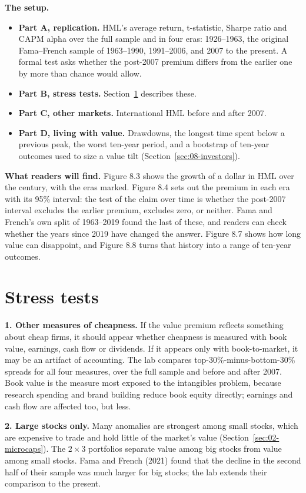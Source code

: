 \textbf{The setup.}

\begin{itemize}
  \item \textbf{Part A, replication.} HML's average return, t-statistic, Sharpe ratio and CAPM alpha over the full sample and in four eras: 1926--1963, the original Fama--French sample of 1963--1990, 1991--2006, and 2007 to the present. A formal test asks whether the post-2007 premium differs from the earlier one by more than chance would allow.
  \item \textbf{Part B, stress tests.} Section~\ref{sec:08-stress} describes these.
  \item \textbf{Part C, other markets.} International HML before and after 2007.
  \item \textbf{Part D, living with value.} Drawdowns, the longest time spent below a previous peak, the worst ten-year period, and a bootstrap of ten-year outcomes used to size a value tilt (Section~\ref{sec:08-investors}).
\end{itemize}

\textbf{What readers will find.} Figure 8.3 shows the growth of a dollar in HML over the century, with the eras marked. Figure 8.4 sets out the premium in each era with its 95\% interval: the test of the claim over time is whether the post-2007 interval excludes the earlier premium, excludes zero, or neither. Fama and French's own split of 1963--2019 found the last of these, and readers can check whether the years since 2019 have changed the answer. Figure 8.7 shows how long value can disappoint, and Figure 8.8 turns that history into a range of ten-year outcomes.

\section{Stress tests}
\label{sec:08-stress}

\textbf{1. Other measures of cheapness.} If the value premium reflects something about cheap firms, it should appear whether cheapness is measured with book value, earnings, cash flow or dividends. If it appears only with book-to-market, it may be an artifact of accounting. The lab compares top-30\%-minus-bottom-30\% spreads for all four measures, over the full sample and before and after 2007. Book value is the measure most exposed to the intangibles problem, because research spending and brand building reduce book equity directly; earnings and cash flow are affected too, but less.

\textbf{2. Large stocks only.} Many anomalies are strongest among small stocks, which are expensive to trade and hold little of the market's value (Section~\ref{sec:02-microcaps}). The $2 \times 3$ portfolios separate value among big stocks from value among small stocks. Fama and French (2021) found that the decline in the second half of their sample was much larger for big stocks; the lab extends their comparison to the present.

